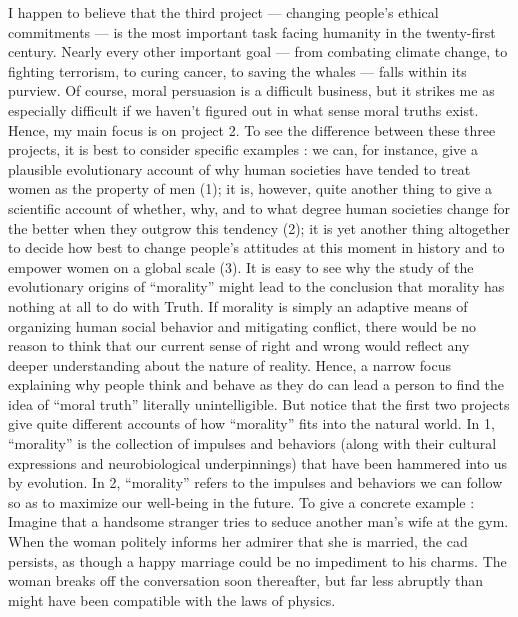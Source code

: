 \documentclass[a4paper,14pt]{extarticle}
\begin{document}
I happen to believe that the third project --- changing people's ethical commitments --- is the most important task facing humanity in the twenty-first century.
Nearly every other important goal --- from combating climate change, to fighting terrorism, to curing cancer, to saving the whales --- falls within its purview.
Of course, moral persuasion is a difficult business, but it strikes me as especially difficult if we haven't figured out in what sense moral truths exist.
Hence, my main focus is on project 2.
To see the difference between these three projects, it is best to consider specific examples :
we can, for instance, give a plausible evolutionary account of why human societies have tended to treat women as the property of men (1);
it is, however, quite another thing to give a scientific account of whether, why, and to what degree human societies change for the better when they outgrow this tendency (2);
it is yet another thing altogether to decide how best to change people's attitudes at this moment in history and to empower women on a global scale (3).
It is easy to see why the study of the evolutionary origins of ``morality'' might lead to the conclusion that morality has nothing at all to do with Truth.
If morality is simply an adaptive means of organizing human social behavior and mitigating conflict, there would be no reason to think that our current sense of right and wrong would reflect any deeper understanding about the nature of reality.
Hence, a narrow focus explaining why people think and behave as they do can lead a person to find the idea of ``moral truth'' literally unintelligible.
But notice that the first two projects give quite different accounts of how ``morality'' fits into the natural world.
In 1, ``morality'' is the collection of impulses and behaviors (along with their cultural expressions and neurobiological underpinnings) that have been hammered into us by evolution.
In 2, ``morality'' refers to the impulses and behaviors we can follow so as to maximize our well-being in the future.
To give a concrete example :
Imagine that a handsome stranger tries to seduce another man's wife at the gym.
When the woman politely informs her admirer that she is married, the cad persists, as though a happy marriage could be no impediment to his charms.
The woman breaks off the conversation soon thereafter, but far less abruptly than might have been compatible with the laws of physics.
\end{document}
